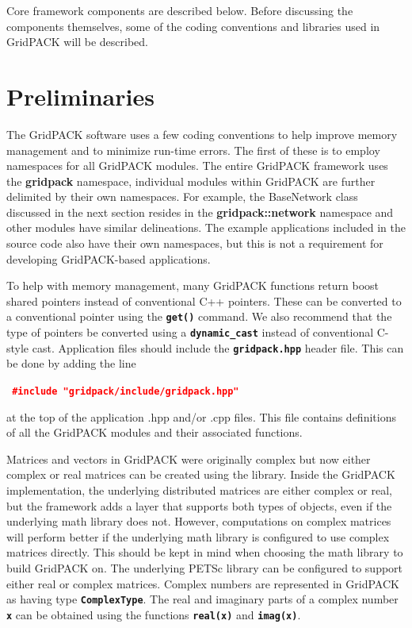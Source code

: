 \documentclass[12pt]{report} %
\begin{document}



Core framework components are described below. Before discussing the components themselves, some of the coding conventions and libraries used in GridPACK will be described.

\section{Preliminaries} The GridPACK software uses a few coding conventions to help improve memory management and to minimize run-time errors. The first of these is to employ namespaces for all GridPACK modules. The entire GridPACK framework uses the \textbf{gridpack} namespace, individual modules within GridPACK are further delimited by their own namespaces. For example, the BaseNetwork class discussed in the next section resides in the \textbf{gridpack::network} namespace and other modules have similar delineations. The example applications included in the source code also have their own namespaces, but this is not a requirement for developing GridPACK-based applications.

To help with memory management, many GridPACK functions return boost shared pointers instead of conventional C++ pointers. These can be converted to a conventional pointer using the \texttt{\textbf{get()}} command. We also recommend that the type of pointers be converted using a \texttt{\textbf{dynamic\_cast}} instead of conventional C-style cast.
Application files should include the \texttt{\textbf{gridpack.hpp}} header file. This can be done by adding the line

\textcolor{red}{\texttt{\textbf{    \#include "gridpack/include/gridpack.hpp"}}}

at the top of the application .hpp and/or .cpp files. This file contains definitions of all the GridPACK modules and their associated functions.

Matrices and vectors in GridPACK were originally complex but now either complex or real matrices can be created using the library. Inside the GridPACK implementation, the underlying distributed matrices are either complex or real, but the framework adds a layer that supports both types of objects, even if the underlying math library does not. However, computations on complex matrices will perform better if the underlying math library is configured to use complex matrices directly. This should be kept in mind when choosing the math library to build GridPACK on. The underlying PETSc library can be configured to support either real or complex matrices. Complex numbers are represented in GridPACK as having type \texttt{\textbf{ComplexType}}. The real and imaginary parts of a complex number \texttt{\textbf{x}} can be obtained using the functions \texttt{\textbf{real(x)}} and \texttt{\textbf{imag(x)}}.
\end{document}
